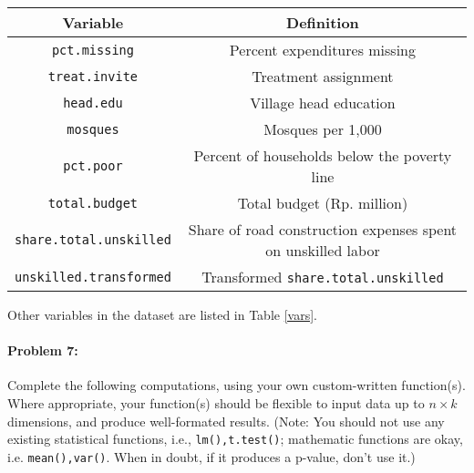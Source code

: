 \documentclass{article}
\begin{document}
\begin{table*}[h]
  \caption{Variables \label{vars}}
  \centering
  \begin{tabular}{c|c}
    \hline \textbf{Variable} & \textbf{Definition}\\ \hline
    \texttt{pct.missing} & Percent expenditures missing\\
    \texttt{treat.invite} & Treatment assignment \\ 
    \texttt{head.edu} & Village head education \\
    \texttt{mosques} & Mosques per 1,000 \\
    \texttt{pct.poor} & Percent of households below the poverty line\\
    \texttt{total.budget} & Total budget (Rp. million)\\
    \texttt{share.total.unskilled} & Share of road construction expenses spent on
    unskilled labor\\
    \texttt{unskilled.transformed} & Transformed \texttt{share.total.unskilled}
   \end{tabular}
\end{table*}
Other variables in the dataset are listed in Table \ref{vars}. 





\paragraph{Problem 7:} Complete the following computations, using your
own custom-written function(s). Where appropriate, your function(s)
should be flexible to input data up to $n\times k$ dimensions, and
produce well-formated results.  (Note: You should not use any existing
statistical functions, i.e., \texttt{lm(),t.test()}; mathematic
functions are okay, i.e. \texttt{mean(),var()}.  When in doubt, if it
produces a p-value, don't use it.)
\end{document}
